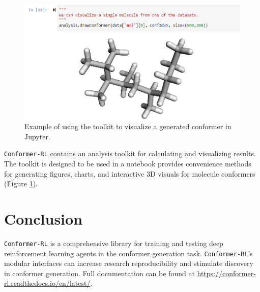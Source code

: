 \documentclass[twoside,11pt]{article}
\newcommand{\code}[1]{\texttt{#1}}
\newcommand{\titleofpaper}{Conformer-RL}
\begin{document}
\begin{figure}[h]
  \centering
  \includegraphics[scale=0.75]{molecules.png}
  \caption{
    Example of using the toolkit to visualize a generated conformer in Jupyter.
  }
  \label{fig:molecules}
\end{figure}

\code{\titleofpaper} contains an analysis toolkit for calculating and visualizing results. The toolkit is designed to be used in a notebook provides convenience methods for generating figures, charts, and interactive 3D visuals for molecule conformers (Figure \ref{fig:molecules}).

\section{Conclusion}
\code{\titleofpaper} is a comprehensive library for training and testing deep reinforcement learning agents in the conformer generation task. \code{\titleofpaper}'s modular interfaces can increase research reproducibility and stimulate discovery in conformer generation. Full documentation can be found at \url{https://conformer-rl.readthedocs.io/en/latest/}.



\newpage


\vskip 0.2in




\newpage

\end{document}
